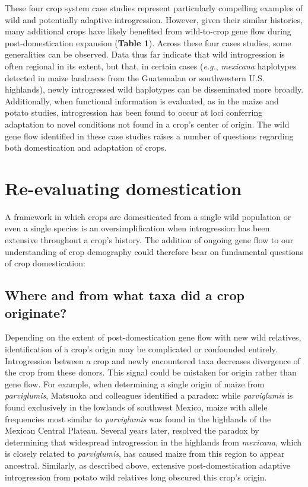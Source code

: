 \documentclass[11pt]{article}
\begin{document}
{These four crop system case studies represent particularly compelling examples of wild and potentially adaptive introgression.
However, given their similar histories, many additional crops have likely benefited from wild-to-crop gene flow during post-domestication expansion (\textbf{Table 1}).
Across these four cases studies, some generalities can be observed.
Data thus far indicate that wild introgression is often regional in its extent, but that, in certain cases (\emph{e.g.}, \emph{mexicana} haplotypes detected in maize landraces from the Guatemalan or southwestern U.S. highlands), newly introgressed wild haplotypes can be disseminated more broadly.
Additionally, when functional information is evaluated, as in the maize and potato studies, introgression has been found to occur at loci conferring adaptation to novel conditions not found in a crop's center of origin.
The wild gene flow identified in these case studies raises a number of questions regarding both domestication and adaptation of crops.

\section*{Re-evaluating domestication}

A framework in which crops are domesticated from a single wild population or even a single species is an oversimplification when introgression has been extensive throughout a crop's history.
The addition of ongoing gene flow to our understanding of crop demography could therefore bear on fundamental questions of crop domestication:

\subsection*{Where and from what taxa did a crop originate?}
Depending on the extent of post-domestication gene flow with new wild relatives, identification of a crop's origin may be complicated or confounded entirely.
Introgression between a crop and newly encountered taxa decreases divergence of the crop from these donors.
This signal could be mistaken for origin rather than gene flow.
For example, when determining a single origin of maize from \emph{parviglumis}, Matsuoka and colleagues \citeyearpar{matsuoka2002single} identified a paradox: while \emph{parviglumis} is found exclusively in the lowlands of southwest Mexico, maize with allele frequencies most similar to \emph{parviglumis} was found in the highlands of the Mexican Central Plateau.
Several years later, \citet{vanHeerwaarden2011} resolved the paradox by determining that widespread introgression in the highlands from \emph{mexicana}, which is closely related to \emph{parviglumis}, has caused maize from this region to appear ancestral.
Similarly, as described above, extensive post-domestication adaptive introgression from potato wild relatives long obscured this crop's origin.

}
\end{document}
